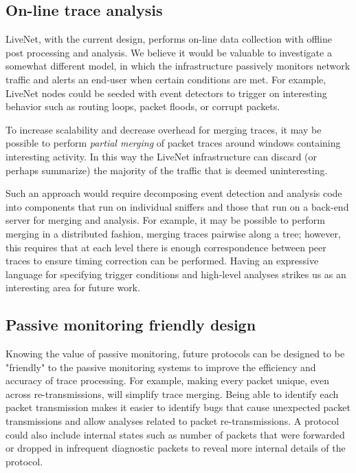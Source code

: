 \subsection{On-line trace analysis}

LiveNet, with the current design, performs on-line data collection with offline
post processing and analysis. We believe it would be valuable to 
investigate a somewhat different model, in which the infrastructure 
passively monitors network traffic and alerts an end-user when certain
conditions are met. For example, LiveNet nodes could be seeded with event
detectors to trigger on interesting behavior such as routing
loops, packet floods, or corrupt packets. 

To increase scalability and decrease overhead for merging traces, it may be
possible to perform {\em partial merging} of packet traces 
around windows containing interesting activity. In this way the
LiveNet infrastructure can discard (or perhaps summarize) the
majority of the traffic that is deemed uninteresting. 

Such an approach would
require decomposing event detection and analysis code into components
that run on individual sniffers and those that run on a back-end
server for merging and analysis. For example, it may be possible to
perform merging in a distributed fashion, merging traces pairwise
along a tree; however, this requires that at each level there is
enough correspondence between peer traces to ensure timing correction
can be performed. Having an expressive language for specifying
trigger conditions and high-level analyses strikes us as an
interesting area for future work.

\subsection{Passive monitoring friendly design}

Knowing the value of passive monitoring, future protocols can be designed to
be "friendly" to the passive monitoring systems to improve the
efficiency and accuracy of trace processing. For example, making every packet
unique, even across re-transmissions, will simplify trace merging. Being
able to identify each packet transmission makes it easier to identify bugs
that cause unexpected packet transmissions and allow analyses related
to packet re-transmissions. A protocol could also include internal states such
as number of packets that were forwarded or dropped in infrequent diagnostic
packets to reveal more internal details of the protocol. 


